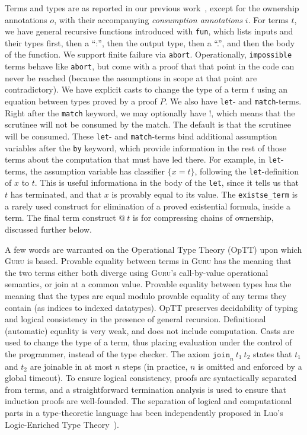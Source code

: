 \documentclass[9pt,natbib]{sigplanconf}
\begin{document}
Terms and types are as reported in our previous work~\cite{guru09},
except for the ownership annotations $o$, with their accompanying
\emph{consumption annotations} $i$.  For terms $t$, we have general
recursive functions introduced with \texttt{fun}, which lists inputs
and their types first, then a ``:'', then the output type, then a
``.'', and then the body of the function.  We support finite failure
via \texttt{abort}.  Operationally, \texttt{impossible} terms behave
like \texttt{abort}, but come with a proof that that point in the code
can never be reached (because the assumptions in scope at that point
are contradictory).  We have explicit casts to change the type of a
term $t$ using an equation between types proved by a proof $P$.  We
also have \texttt{let}- and \texttt{match}-terms.  Right after the
\texttt{match} keyword, we may optionally have $!$, which means that
the scrutinee will not be consumed by the match.  The default is that
the scrutinee will be consumed.  These \texttt{let}- and
\texttt{match}-terms bind additional assumption variables after the
\texttt{by} keyword, which provide information in the rest of those
terms about the computation that must have led there.  For example, in
\texttt{let}-terms, the assumption variable has classifier $\{ x = t
\}$, following the \texttt{let}-definition of $x$ to $t$.  This is
useful informationa in the body of the \texttt{let}, since it tells us
that $t$ has terminated, and that $x$ is provably equal to its value.
The \texttt{existse\_term} is a rarely used construct for elimination
of a proved existential formula, inside a term.  The final term
construct $@\ t$ is for compressing chains of ownership, discussed
further below.

A few words are warranted on the Operational Type Theory (OpTT) upon
which \textsc{Guru} is based.  Provable equality between terms in
\textsc{Guru} has the meaning that the two terms either both diverge
using \textsc{Guru}'s call-by-value operational semantics, or join at
a common value.  Provable equality between types has the meaning that
the types are equal modulo provable equality of any terms they contain
(as indices to indexed datatypes).  OpTT preserves decidability of
typing and logical consistency in the presence of general recursion.
Definitional (automatic) equality is very weak, and does not include
computation.  Casts are used to change the type of a term, thus
placing evaluation under the control of the programmer, instead of the
type checker.  The axiom $\texttt{join}_n\ t_1\ t_2$ states that $t_1$
and $t_2$ are joinable in at most $n$ steps (in practice, $n$ is
omitted and enforced by a global timeout).  To ensure logical
consistency, proofs are syntactically separated from terms, and a
straightforward termination analysis is used to ensure that induction
proofs are well-founded.  The separation of logical and computational
parts in a type-theoretic language has been independently proposed in
Luo's Logic-Enriched Type Theory~\cite{luo08}).
\end{document}
